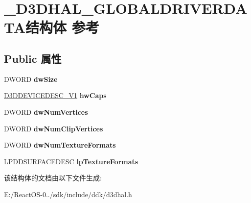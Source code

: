 \hypertarget{struct___d3_d_h_a_l___g_l_o_b_a_l_d_r_i_v_e_r_d_a_t_a}{}\section{\+\_\+\+D3\+D\+H\+A\+L\+\_\+\+G\+L\+O\+B\+A\+L\+D\+R\+I\+V\+E\+R\+D\+A\+T\+A结构体 参考}
\label{struct___d3_d_h_a_l___g_l_o_b_a_l_d_r_i_v_e_r_d_a_t_a}
\subsection*{Public 属性}
\begin{DoxyCompactItemize}
\item 
\mbox{\label{struct___d3_d_h_a_l___g_l_o_b_a_l_d_r_i_v_e_r_d_a_t_a_afb8390bf751887d3ef936451f2e5ef60}} 
D\+W\+O\+RD {\bfseries dw\+Size}
\item 
\mbox{\label{struct___d3_d_h_a_l___g_l_o_b_a_l_d_r_i_v_e_r_d_a_t_a_ae181ca7e554b63f49142f60c26111a9c}} 
\hyperlink{struct___d3_d_device_desc___v1}{D3\+D\+D\+E\+V\+I\+C\+E\+D\+E\+S\+C\+\_\+\+V1} {\bfseries hw\+Caps}
\item 
\mbox{\label{struct___d3_d_h_a_l___g_l_o_b_a_l_d_r_i_v_e_r_d_a_t_a_ab495ddcf617ee9d27b1298ad0de7e66d}} 
D\+W\+O\+RD {\bfseries dw\+Num\+Vertices}
\item 
\mbox{\label{struct___d3_d_h_a_l___g_l_o_b_a_l_d_r_i_v_e_r_d_a_t_a_a94b0d9e537bc9ad4d623e7bbe3b835d8}} 
D\+W\+O\+RD {\bfseries dw\+Num\+Clip\+Vertices}
\item 
\mbox{\label{struct___d3_d_h_a_l___g_l_o_b_a_l_d_r_i_v_e_r_d_a_t_a_aa52c91f402ef56fa4a0194cba8eddbe0}} 
D\+W\+O\+RD {\bfseries dw\+Num\+Texture\+Formats}
\item 
\mbox{\label{struct___d3_d_h_a_l___g_l_o_b_a_l_d_r_i_v_e_r_d_a_t_a_a8a1eb112e64ec76dfd68e4ade03b22a7}} 
\hyperlink{interfacevoid}{L\+P\+D\+D\+S\+U\+R\+F\+A\+C\+E\+D\+E\+SC} {\bfseries lp\+Texture\+Formats}
\end{DoxyCompactItemize}


该结构体的文档由以下文件生成\+:\begin{DoxyCompactItemize}
\item 
E\+:/\+React\+O\+S-\/0../sdk/include/ddk/d3dhal.\+h\end{DoxyCompactItemize}
